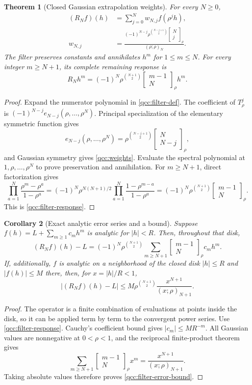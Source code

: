 \documentclass[11pt,a4paper,oneside,openany]{book}
\newtheorem{theorem}{Theorem}[chapter]
\newtheorem{corollary}[theorem]{Corollary}
\theoremstyle{definition}
\theoremstyle{remark}
\newcommand{\GB}[3][q]{\begin{bmatrix}#2\\#3\end{bmatrix}_{#1}}
\begin{document}
\begin{theorem}[Closed Gaussian extrapolation weights]
\label{qcc:filter-weights}
For every \(N\ge0\),
\begin{align}
 (R_Nf)(h)&=\sum_{j=0}^{N}w_{N,j}f(\rho^jh),
          \label{qcc:filter-sum}\\
 w_{N,j}&=
 \frac{(-1)^{N-j}\rho^{\binom{N-j+1}{2}}
                \GB[\rho]Nj}{(\rho;\rho)_N}.
          \label{qcc:weights}
\end{align}
The filter preserves constants and annihilates \(h^m\) for
\(1\le m\le N\). For every integer \(m\ge N+1\), its complete
remaining response is
\begin{equation}\label{qcc:filter-response}
 R_Nh^m=(-1)^N\rho^{\binom{N+1}{2}}
              \GB[\rho]{m-1}{N}h^m.
\end{equation}
\end{theorem}
\begin{proof}
Expand the numerator polynomial in \eqref{qcc:filter-def}. The coefficient
of \(T_\rho^j\) is
\((-1)^{N-j}e_{N-j}(\rho,\ldots,\rho^N)\). Principal specialization
of the elementary symmetric function gives
\[
 e_{N-j}(\rho,\ldots,\rho^N)
 =\rho^{\binom{N-j+1}{2}}\GB[\rho]{N}{N-j},
\]
and Gaussian symmetry gives \eqref{qcc:weights}. Evaluate the spectral
polynomial at \(1,\rho,\ldots,\rho^N\) to prove preservation and
annihilation. For \(m\ge N+1\), direct factorization gives
\[
 \prod_{a=1}^{N}\frac{\rho^m-\rho^a}{1-\rho^a}
 =(-1)^N\rho^{N(N+1)/2}
      \prod_{a=1}^{N}\frac{1-\rho^{m-a}}{1-\rho^a}
 =(-1)^N\rho^{\binom{N+1}{2}}\GB[\rho]{m-1}{N}.
\]
This is \eqref{qcc:filter-response}.
\end{proof}

\begin{corollary}[Exact analytic error series and a bound]
\label{qcc:filter-error}
Suppose \(f(h)=L+\sum_{m\ge1}c_mh^m\) is analytic for \(|h|<R\).
Then, throughout that disk,
\begin{equation}\label{qcc:filter-error-series}
 (R_Nf)(h)-L=(-1)^N\rho^{\binom{N+1}{2}}
       \sum_{m\ge N+1}\GB[\rho]{m-1}{N}c_mh^m.
\end{equation}
If, additionally, \(f\) is analytic on a neighborhood of the closed disk
\(|h|\le R\) and \(|f(h)|\le M\) there, then, for \(x=|h|/R<1\),
\begin{equation}\label{qcc:filter-error-bound}
 |(R_Nf)(h)-L|
 \le M\rho^{\binom{N+1}{2}}
                  \frac{x^{N+1}}{(x;\rho)_{N+1}}.
\end{equation}
\end{corollary}
\begin{proof}
The operator is a finite combination of evaluations at points inside the disk,
so it can be applied term by term to the convergent power series. Use
\eqref{qcc:filter-response}. Cauchy's coefficient bound gives
\(|c_m|\le M R^{-m}\). All Gaussian values are nonnegative at
\(0<\rho<1\), and the reciprocal finite-product theorem gives
\[
 \sum_{m\ge N+1}\GB[\rho]{m-1}{N}x^m
   =\frac{x^{N+1}}{(x;\rho)_{N+1}}.
\]
Taking absolute values therefore proves \eqref{qcc:filter-error-bound}.
\end{proof}
\end{document}
